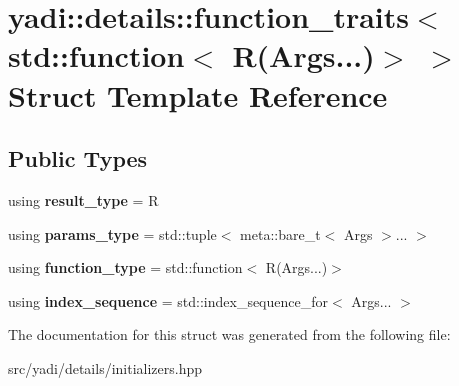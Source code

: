 \hypertarget{structyadi_1_1details_1_1function__traits_3_01std_1_1function_3_01_r_07_args_8_8_8_08_4_01_4}{}\section{yadi\+:\+:details\+:\+:function\+\_\+traits$<$ std\+:\+:function$<$ R(Args...)$>$ $>$ Struct Template Reference}
\label{structyadi_1_1details_1_1function__traits_3_01std_1_1function_3_01_r_07_args_8_8_8_08_4_01_4}
\subsection*{Public Types}
\begin{DoxyCompactItemize}
\item 
\mbox{\label{structyadi_1_1details_1_1function__traits_3_01std_1_1function_3_01_r_07_args_8_8_8_08_4_01_4_ac068b05439b1192cd569fa36f2dfc27a}} 
using {\bfseries result\+\_\+type} = R
\item 
\mbox{\label{structyadi_1_1details_1_1function__traits_3_01std_1_1function_3_01_r_07_args_8_8_8_08_4_01_4_a3f7c503ebb6e36d7dfabb9f172fa45a3}} 
using {\bfseries params\+\_\+type} = std\+::tuple$<$ meta\+::bare\+\_\+t$<$ Args $>$... $>$
\item 
\mbox{\label{structyadi_1_1details_1_1function__traits_3_01std_1_1function_3_01_r_07_args_8_8_8_08_4_01_4_a736c672a78223b1be22be46ed7910c78}} 
using {\bfseries function\+\_\+type} = std\+::function$<$ R(Args...)$>$
\item 
\mbox{\label{structyadi_1_1details_1_1function__traits_3_01std_1_1function_3_01_r_07_args_8_8_8_08_4_01_4_ada4af304d47ba359182ee23002f372e1}} 
using {\bfseries index\+\_\+sequence} = std\+::index\+\_\+sequence\+\_\+for$<$ Args... $>$
\end{DoxyCompactItemize}


The documentation for this struct was generated from the following file\+:\begin{DoxyCompactItemize}
\item 
src/yadi/details/initializers.\+hpp\end{DoxyCompactItemize}
